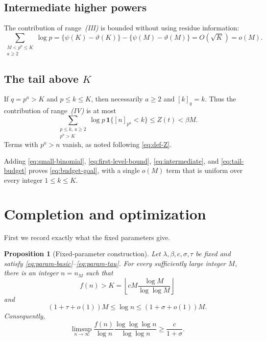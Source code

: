 \documentclass[11pt]{article}
\newtheorem{proposition}[theorem]{Proposition}
\theoremstyle{remark}
\newcommand{\ind}{\mathbf 1}
\begin{document}
\subsection{Intermediate higher powers}

The contribution of range~\emph{(III)} is bounded without using residue
information:
\begin{equation}\label{eq:intermediate}
 \sum_{\substack{M<p^a\leq K\\a\geq2}}\log p
 =\{\psi(K)-\vartheta(K)\}
  -\{\psi(M)-\vartheta(M)\}
 =O(\sqrt K)=o(M).
\end{equation}

\subsection{\texorpdfstring{The tail above \(K\)}{The tail above K}}

If \(q=p^a>K\) and \(p\leq k\leq K\), then necessarily \(a\geq2\) and
\([k]_q=k\).  Thus the contribution of range~\emph{(IV)} is at most
\begin{equation}\label{eq:tail-budget}
 \sum_{\substack{p\leq k,\ a\geq2\\p^a>K}}
 \log p\,\ind\{[n]_{p^a}<k\}
 \leq Z(t)<\beta M.
\end{equation}
Terms with \(p^a>n\) vanish, as noted following \eqref{eq:def-Z}.

Adding \eqref{eq:small-binomial}, \eqref{eq:first-level-bound},
\eqref{eq:intermediate}, and \eqref{eq:tail-budget} proves
\eqref{eq:budget-goal}, with a single \(o(M)\) term that is uniform over every
integer \(1\leq k\leq K\).

\section{Completion and optimization}\label{sec:optimization}

First we record exactly what the fixed parameters give.

\begin{proposition}[Fixed-parameter construction]\label{prop:fixed}
Let \(\lambda,\beta,c,\sigma,\tau\) be fixed and satisfy
\eqref{eq:param-basic}--\eqref{eq:param-tau}.  For every sufficiently large
integer \(M\), there is an integer \(n=n_M\) such that
\begin{equation}\label{eq:fixed-conclusion}
 f(n)>K=\left\lfloor cM\frac{\log M}{\log\log M}\right\rfloor
\end{equation}
and
\begin{equation}\label{eq:n-size}
 (1+\tau+o(1))M\leq\log n\leq(1+\sigma+o(1))M.
\end{equation}
Consequently,
\begin{equation}\label{eq:fixed-normalized}
 \limsup_{n\to\infty}
 \frac{f(n)}{\log n}
 \frac{\log\log\log n}{\log\log n}
 \geq\frac{c}{1+\sigma}.
\end{equation}
\end{proposition}
\end{document}
